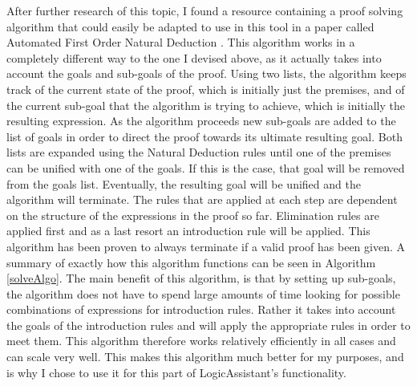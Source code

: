 After further research of this topic, I found a resource containing a proof solving algorithm that could easily be adapted to use in this tool in a paper called Automated First Order Natural Deduction \cite{ndAlgo}.  This algorithm works in a completely different way to the one I devised above, as it actually takes into account the goals and sub-goals of the proof. Using two lists, the algorithm keeps track of the current state of the proof, which is initially just the premises, and of the current sub-goal that the algorithm is trying to achieve, which is initially the resulting expression. As the algorithm proceeds new sub-goals are added to the list of goals in order to direct the proof towards its ultimate resulting goal. Both lists are expanded using the Natural Deduction rules until one of the premises can be unified with one of the goals. If this is the case, that goal will be removed from the goals list. Eventually, the resulting goal will be unified and the algorithm will terminate. The rules that are applied at each step are dependent on the structure of the expressions in the proof so far. Elimination rules are applied first and as a last resort an introduction rule will be applied. This algorithm has been proven to always terminate if a valid proof has been given. A summary of exactly how this algorithm functions can be seen in Algorithm \ref{solveAlgo}. The main benefit of this algorithm, is that by setting up sub-goals, the algorithm does not have to spend large amounts of time looking for possible combinations of expressions for introduction rules. Rather it takes into account the goals of the introduction rules and will apply the appropriate rules in order to meet them. This algorithm therefore works relatively efficiently in all cases and can scale very well. This makes this algorithm much better for my purposes, and is why I chose to use it for this part of LogicAssistant's functionality. 

